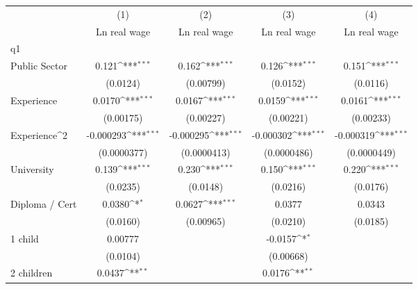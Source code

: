 {
\def\sym#1{\ifmmode^{#1}\else\(^{#1}\)\fi}
\begin{tabular}{l*{4}{c}}
\hline\hline
                    &\multicolumn{1}{c}{(1)}&\multicolumn{1}{c}{(2)}&\multicolumn{1}{c}{(3)}&\multicolumn{1}{c}{(4)}\\
                    &\multicolumn{1}{c}{Ln real wage}&\multicolumn{1}{c}{Ln real wage}&\multicolumn{1}{c}{Ln real wage}&\multicolumn{1}{c}{Ln real wage}\\
\hline
q1                  &                     &                     &                     &                     \\
Public Sector       &       0.121\sym{***}&       0.162\sym{***}&       0.126\sym{***}&       0.151\sym{***}\\
                    &    (0.0124)         &   (0.00799)         &    (0.0152)         &    (0.0116)         \\
[1em]
Experience          &      0.0170\sym{***}&      0.0167\sym{***}&      0.0159\sym{***}&      0.0161\sym{***}\\
                    &   (0.00175)         &   (0.00227)         &   (0.00221)         &   (0.00233)         \\
[1em]
Experience^{2}      &   -0.000293\sym{***}&   -0.000295\sym{***}&   -0.000302\sym{***}&   -0.000319\sym{***}\\
                    & (0.0000377)         & (0.0000413)         & (0.0000486)         & (0.0000449)         \\
[1em]
University          &       0.139\sym{***}&       0.230\sym{***}&       0.150\sym{***}&       0.220\sym{***}\\
                    &    (0.0235)         &    (0.0148)         &    (0.0216)         &    (0.0176)         \\
[1em]
Diploma / Cert      &      0.0380\sym{*}  &      0.0627\sym{***}&      0.0377         &      0.0343         \\
                    &    (0.0160)         &   (0.00965)         &    (0.0210)         &    (0.0185)         \\
[1em]
1 child             &     0.00777         &                     &     -0.0157\sym{*}  &                     \\
                    &    (0.0104)         &                     &   (0.00668)         &                     \\
[1em]
2 children          &      0.0437\sym{**} &                     &      0.0176\sym{**} &                     \\

\end{tabular}}
